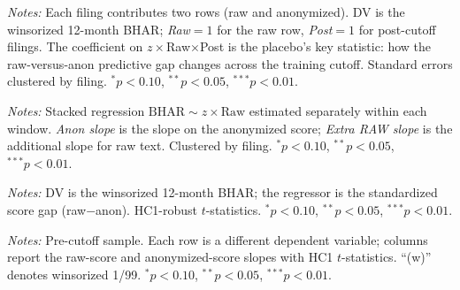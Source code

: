 \documentclass[12pt]{article}
\begin{document}
\begin{table}[htbp]\centering
\begin{threeparttable}
\caption{Stacked triple-interaction test}\label{tab:interaction}\small

\begin{tablenotes}\small\item \textit{Notes:} Each filing contributes two rows (raw and
anonymized). DV is the winsorized 12-month BHAR; \emph{Raw}$=1$ for the raw row,
\emph{Post}$=1$ for post-cutoff filings. The coefficient on $z\times$Raw$\times$Post is the
placebo's key statistic: how the raw-versus-anon predictive gap changes across the training
cutoff. Standard errors clustered by filing. $^{*}p<0.10$, $^{**}p<0.05$, $^{***}p<0.01$.
\end{tablenotes}
\end{threeparttable}
\end{table}

\begin{table}[htbp]\centering
\begin{threeparttable}
\caption{Within-window raw-versus-anon slope gap}\label{tab:within}\small

\begin{tablenotes}\small\item \textit{Notes:} Stacked regression $\text{BHAR}\sim z\times
\text{Raw}$ estimated separately within each window. \emph{Anon slope} is the slope on the
anonymized score; \emph{Extra RAW slope} is the additional slope for raw text. Clustered by
filing. $^{*}p<0.10$, $^{**}p<0.05$, $^{***}p<0.01$.
\end{tablenotes}
\end{threeparttable}
\end{table}

\begin{table}[htbp]\centering
\begin{threeparttable}
\caption{Does the raw$-$anon score gap predict returns?}\label{tab:gap}\small

\begin{tablenotes}\small\item \textit{Notes:} DV is the winsorized 12-month BHAR; the
regressor is the standardized score gap (raw$-$anon). HC1-robust $t$-statistics.
$^{*}p<0.10$, $^{**}p<0.05$, $^{***}p<0.01$.
\end{tablenotes}
\end{threeparttable}
\end{table}

\begin{table}[htbp]\centering
\begin{threeparttable}
\caption{Robustness: alternative outcome horizons (pre-cutoff)}\label{tab:robust}\small

\begin{tablenotes}\small\item \textit{Notes:} Pre-cutoff sample. Each row is a different
dependent variable; columns report the raw-score and anonymized-score slopes with HC1
$t$-statistics. ``(w)'' denotes winsorized 1/99. $^{*}p<0.10$, $^{**}p<0.05$, $^{***}p<0.01$.
\end{tablenotes}
\end{threeparttable}
\end{table}
\end{document}
